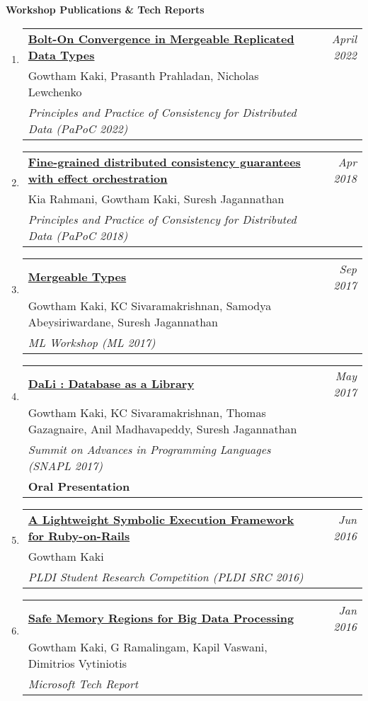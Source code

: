 \documentclass[10pt]{article}
\makeatletter
\newcommand{\lbar}[1]{{\color{#1}\ding{118}}\hspace*{2pt}}
\newenvironment{benumerate}[2]{
    \let\oldItem\item
    \def\item{\addtocounter{enumi}{-2}\oldItem}
    \begin{enumerate}[#2] \itemsep3pt
    \setcounter{enumi}{#1}
    \addtocounter{enumi}{1}}
  {\end{enumerate}}
\newenvironment{publication}[5]
{ \item
  \begin{tabular*}{7.5in}{p{6.3in}@{\extracolsep{\fill}}r}
    \href{#1}{\textbf{#2}} & \textit{#3}\\ #4 &\\ \textit{#5}&\\
  \end{tabular*}
} {}
\newenvironment{publicationNote}[6]
{ \item
  \begin{tabular*}{7.5in}{p{6.3in}@{\extracolsep{\fill}}r}
    \href{#1}{\textbf{#2}} & \textit{#3}\\ #4 &\\ \textit{#5}\\ \textbf{#6} \\
  \end{tabular*}
} {}
\newenvironment{region}[3]{%
  \vspace*{0.5ex}
  {{\textbf{\large{#1}}}}
  \begin{benumerate}{#3}{\color{RoyalBlue}#2}}
  {\end{benumerate}\vspace{0.8ex}}
\makeatother
\begin{document}
\begin{region} {\lbar{Mahogany}Workshop Publications \& Tech Reports}{{W}1}{5}

	\begin{publication} {http://gowthamk.github.io/docs/papoc22.pdf}
		{Bolt-On Convergence in Mergeable Replicated Data Types}
		{April 2022} {Gowtham Kaki, Prasanth Prahladan, Nicholas Lewchenko}
		{Principles and Practice of Consistency for Distributed Data
    (PaPoC 2022)}
  \end{publication}

	\begin{publication}{https://gowthamk.github.io/docs/papoc18.pdf}
		{Fine-grained distributed consistency guarantees with effect orchestration}
		{Apr 2018}{Kia Rahmani, Gowtham Kaki, Suresh Jagannathan}
    {Principles and Practice of Consistency for Distributed Data (PaPoC 2018)}
  \end{publication}

  \begin{publication}{http://kcsrk.info/papers/mergeable_types_ml17.pdf}
    {Mergeable Types}
    {Sep 2017}{Gowtham Kaki, KC Sivaramakrishnan, Samodya Abeysiriwardane, Suresh Jagannathan}
    {ML Workshop (ML 2017)}
  \end{publication}

	\begin{publicationNote} {http://kcsrk.info/papers/dali_snapl17.pdf}
    {DaLi : Database as a Library}
    {May 2017} {Gowtham Kaki, KC Sivaramakrishnan, Thomas Gazagnaire, Anil Madhavapeddy, Suresh Jagannathan}
    {Summit on Advances in Programming Languages (SNAPL 2017)}
    {Oral Presentation}
  \end{publicationNote}

  \begin{publication}{http://purduepl.github.io/docs/maglev.pdf}
    {A Lightweight Symbolic Execution Framework for Ruby-on-Rails}
    {Jun 2016}{Gowtham Kaki} {PLDI Student Research Competition (PLDI SRC 2016)}
  \end{publication}

  \begin{publication}{https://www.microsoft.com/en-us/research/publication/safe-memory-regions-big-data-processing}
    {Safe Memory Regions for Big Data Processing}
    {Jan 2016}{Gowtham Kaki, G Ramalingam, Kapil Vaswani, Dimitrios
    Vytiniotis} {Microsoft Tech Report}
  \end{publication}

\end{region}
\end{document}
